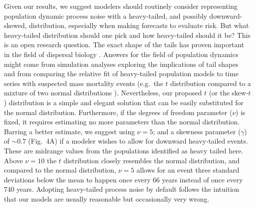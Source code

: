 \documentclass[9pt,twocolumn,twoside]{pnas-new}
\begin{document}


Given our results, we suggest modelers should routinely consider representing population dynamic
process noise with a heavy-tailed, and possibly downward-skewed, distribution,
especially when making forecasts to evaluate risk.
But what heavy-tailed distribution should one pick
and how heavy-tailed should it be?
This is an open research question.
The exact shape of the tails has proven important
in the field of dispersal biology \cite{kot1996, clark1999}.
Answers for the field of population dynamics
might come from simulation analyses exploring
the implications of tail shapes and
from comparing the relative fit of heavy-tailed
population models to time series
with suspected mass mortality events
(e.g.~the $t$ distribution compared to a mixture
of two normal distributions \cite{ward2007}).
Nevertheless, our proposed $t$ (or the skew-$t$) distribution
is a simple and elegant solution that
can be easily substituted for the normal distribution.
Furthermore, if the degrees of freedom parameter ($\nu$)
is fixed,
it requires estimating no more parameters
than the normal distribution.
Barring a better estimate,
we suggest using $\nu = 5$; and
a skewness parameter ($\gamma$) of $\sim 0.7$ (Fig.~4A)
if a modeler wishes to allow for downward heavy-tailed events.
These are midrange values from the populations identified as heavy tailed here.
Above $\nu  =  10$ the $t$ distribution closely resembles
the normal distribution,
and compared to the normal distribution, $\nu  = 5$ allows for an event
three standard deviations below the mean to happen
once every 66 years instead of once every 740 years.
Adopting heavy-tailed process noise by default follows the intuition
that our models are usually reasonable but occasionally very wrong.
\end{document}
